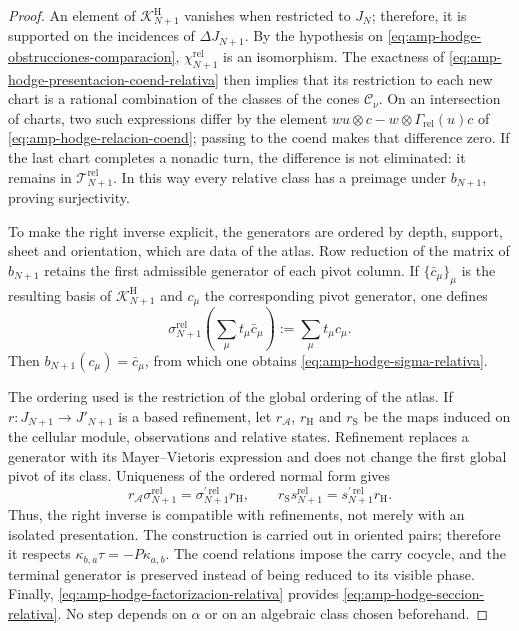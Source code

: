 \begin{proof}
An element of \(\mathscr K^{\mathrm H}_{N+1}\) vanishes when restricted to
\(J_N\); therefore, it is supported on the incidences of
\(\Delta J_{N+1}\). By the hypothesis on
\eqref{eq:amp-hodge-obstrucciones-comparacion},
\(\chi_{N+1}^{\mathrm{rel}}\) is an isomorphism. The exactness of
\eqref{eq:amp-hodge-presentacion-coend-relativa} then implies that its
restriction to each new
chart is a rational combination of the classes of the cones
\(\mathcal C_\nu\). On an intersection of charts, two such expressions
differ by the element
\(wu\otimes c-w\otimes\Gamma_{\mathrm{rel}}(u)c\) of
\eqref{eq:amp-hodge-relacion-coend}; passing to the coend makes that difference
zero. If the last chart completes a nonadic turn, the difference is not
eliminated: it remains in \(\mathscr T_{N+1}^{\mathrm{rel}}\). In this way every
relative class has a preimage under \(b_{N+1}\), proving
surjectivity.

To make the right inverse explicit, the generators are ordered by
depth, support, sheet and orientation, which are data of the atlas. Row
reduction of the matrix of \(b_{N+1}\) retains the first admissible generator
of each pivot column. If
\(\{\bar c_\mu\}_\mu\) is the resulting basis of
\(\mathscr K^{\mathrm H}_{N+1}\) and \(c_\mu\) the corresponding pivot
generator, one defines
\begin{equation}\label{eq:amp-hodge-sigma-coordenada}
 \sigma_{N+1}^{\mathrm{rel}}
 \left(\sum_\mu t_\mu\bar c_\mu\right)
 :=\sum_\mu t_\mu c_\mu.
\end{equation}
Then \(b_{N+1}(c_\mu)=\bar c_\mu\), from which one obtains
\eqref{eq:amp-hodge-sigma-relativa}.

The ordering used is the restriction of the global ordering of the atlas.
If \(r:J_{N+1}\to J'_{N+1}\) is a based refinement, let
\(r_{\mathscr A}\), \(r_{\mathrm H}\) and \(r_{\mathrm S}\) be the maps
induced on the cellular module, observations and relative states.
Refinement replaces a generator with its Mayer--Vietoris
expression and does not change the first global pivot of its class. Uniqueness
of the ordered normal form gives
\begin{equation}\label{eq:amp-hodge-naturalidad-seccion-relativa}
 r_{\mathscr A}\sigma_{N+1}^{\mathrm{rel}}
 =\sigma_{N+1}^{\prime\,\mathrm{rel}}r_{\mathrm H},
 \qquad
 r_{\mathrm S}s_{N+1}^{\mathrm{rel}}
 =s_{N+1}^{\prime\,\mathrm{rel}}r_{\mathrm H}.
\end{equation}
Thus, the right inverse is compatible with refinements, not merely with an
isolated presentation. The construction is carried out in oriented pairs;
therefore it respects
\(\kappa_{b,a}\tau=-P\kappa_{a,b}\). The coend relations impose the
carry cocycle, and the terminal generator is preserved instead of being reduced to
its visible phase. Finally, \eqref{eq:amp-hodge-factorizacion-relativa}
provides \eqref{eq:amp-hodge-seccion-relativa}. No step depends on
\(\alpha\) or on an algebraic class chosen beforehand.
\end{proof}

